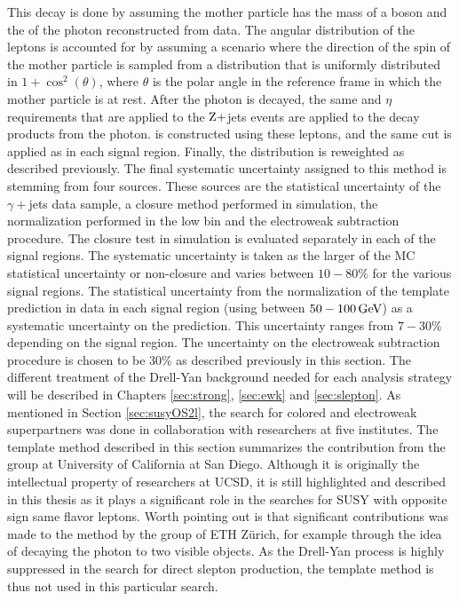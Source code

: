 This decay is done by assuming the mother particle has the mass of a \PZ boson and the \pt of the photon reconstructed from data. 
The angular distribution of the leptons is accounted for by assuming a scenario where the direction of the spin of the mother particle is sampled from a distribution that is uniformly distributed in $1+\cos^{2}(\theta)$, where $\theta$ is the polar angle in the reference frame in which the mother particle is at rest. 
After the photon is decayed, the same \pt and $\eta$ requirements that are applied to the $\mathrm{Z}+$jets events are applied to the decay products from the photon. 
\mttwol is constructed using these leptons, and the same cut is applied as in each signal region. 
Finally, the \pt distribution is reweighted as described previously.
\newpara
\noindent\justify
The final systematic uncertainty assigned to this method is stemming from four sources. 
These sources are the statistical uncertainty of the $\gamma+$jets data sample, a closure method performed in simulation, the normalization performed in the low \ptmiss bin and the electroweak subtraction procedure. 
The closure test in simulation is evaluated separately in each of the signal regions. 
The systematic uncertainty is taken as the larger of the MC statistical uncertainty or non-closure and varies between $10-80\%$ for the various signal regions.
The statistical uncertainty from the normalization of the template prediction in data in each signal region (using \ptmiss between $50-100\,\text{Ge\hspace{-.08em}V}$) as a systematic uncertainty on the prediction. 
This uncertainty ranges from $7-30\%$ depending on the signal region.
The uncertainty on the electroweak subtraction procedure is chosen to be 30\% as described previously in this section. 
The different treatment of the Drell-Yan background needed for each analysis strategy will be described in Chapters \ref{sec:strong}, \ref{sec:ewk} and \ref{sec:slepton}.          
\newpara
\noindent\justify
As mentioned in Section \ref{sec:susyOS2l}, the search for colored and electroweak superpartners was done in collaboration with researchers at five institutes. 
The \ptmiss template method described in this section summarizes the contribution from the group at University of California at San Diego. 
Although it is originally the intellectual property of researchers at UCSD, it is still highlighted and described in this thesis as it plays a significant role in the searches for SUSY with opposite sign same flavor leptons. 
Worth pointing out is that significant contributions was made to the method by the group of ETH Z\"{u}rich, for example through the idea of decaying the photon to two visible objects. 
As the Drell-Yan process is highly suppressed in the search for direct slepton production, the \ptmiss template method is thus not used in this particular search.
